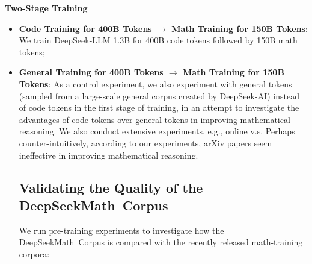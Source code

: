 \textbf{Two-Stage Training}

\begin{itemize}[topsep=0pt]
    \item \textbf{Code Training for 400B Tokens $\rightarrow$ Math Training for 150B Tokens}: We train DeepSeek-LLM 1.3B for 400B code tokens followed by 150B math tokens;
    \item \textbf{General Training for 400B Tokens $\rightarrow$ Math Training for 150B Tokens}: As a control experiment, we also experiment with general tokens (sampled from a large-scale general corpus created by DeepSeek-AI) instead of code tokens in the first stage of training, in an attempt to investigate the advantages of code tokens over general tokens in improving mathematical reasoning. We also conduct extensive experiments, e.g., online v.s. Perhaps counter-intuitively, according to our experiments, arXiv papers seem ineffective in improving mathematical reasoning. \subsection{Validating the Quality of the DeepSeekMath~Corpus}

We run pre-training experiments to investigate how the DeepSeekMath~Corpus is compared with the recently released math-training corpora:


\end{itemize}
